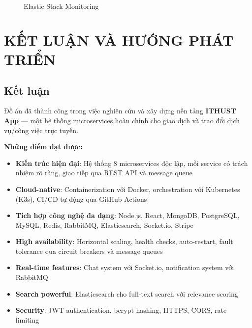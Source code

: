 \documentclass[12pt]{extreport}
\begin{document}
\begin{figure}[H]
    \centering
    \caption{Elastic Stack Monitoring}
    \label{fig:screenshot_kibana}
\end{figure}

\chapter{KẾT LUẬN VÀ HƯỚNG PHÁT TRIỂN}

\section{Kết luận}

Đồ án đã thành công trong việc nghiên cứu và xây dựng nền tảng \textbf{ITHUST App} --- một hệ thống microservices hoàn chỉnh cho giao dịch và trao đổi dịch vụ/công việc trực tuyến.

\textbf{Những điểm đạt được:}

\begin{itemize}
    \item \textbf{Kiến trúc hiện đại}: Hệ thống 8 microservices độc lập, mỗi service có trách nhiệm rõ ràng, giao tiếp qua REST API và message queue
    \item \textbf{Cloud-native}: Containerization với Docker, orchestration với Kubernetes (K3s), CI/CD tự động qua GitHub Actions
    \item \textbf{Tích hợp công nghệ đa dạng}: Node.js, React, MongoDB, PostgreSQL, MySQL, Redis, RabbitMQ, Elasticsearch, Socket.io, Stripe
    \item \textbf{High availability}: Horizontal scaling, health checks, auto-restart, fault tolerance qua circuit breakers và message queues
    \item \textbf{Real-time features}: Chat system với Socket.io, notification system với RabbitMQ
    \item \textbf{Search powerful}: Elasticsearch cho full-text search với relevance scoring
    \item \textbf{Security}: JWT authentication, bcrypt hashing, HTTPS, CORS, rate limiting
\end{itemize}
\end{document}
